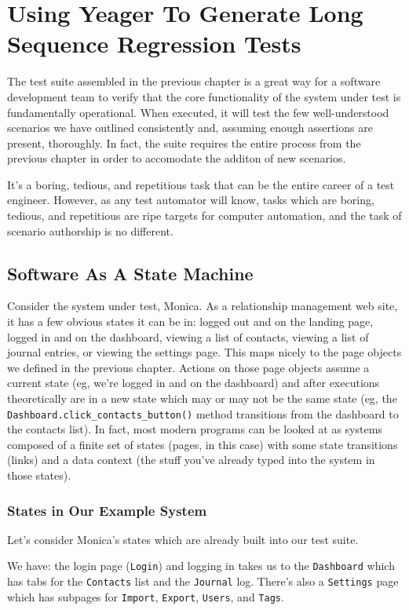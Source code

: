 \chapter{Using Yeager To Generate Long Sequence Regression Tests}
The test suite assembled in the previous chapter is a great way for a software development team to verify that the core functionality of the system under test is fundamentally operational. When executed, it will test the few well-understood scenarios we have outlined consistently and, assuming enough assertions are present, thoroughly. In fact, the suite requires the entire process from the previous chapter in order to accomodate the additon of new scenarios.

It's a boring, tedious, and repetitious task that can be the entire career of a test engineer. However, as any test automator will know, tasks which are boring, tedious, and repetitious are ripe targets for computer automation, and the task of scenario authorship is no different.

\section{Software As A State Machine}
Consider the system under test, Monica. As a relationship management web site, it has a few obvious states it can be in: logged out and on the landing page, logged in and on the dashboard, viewing a list of contacts, viewing a list of journal entries, or viewing the settings page. This maps nicely to the page objects we defined in the previous chapter. Actions on those page objects assume a current state (eg, we're logged in and on the dashboard) and after executions theoretically are in a new state which may or may not be the same state (eg, the \texttt{Dashboard.click\_contacts\_button()} method transitions from the dashboard to the contacts list). In fact, most modern programs can be looked at as systems composed of a finite set of states (pages, in this case) with some state transitions (links) and a data context (the stuff you've already typed into the system in those states).

\subsection{States in Our Example System}
Let's consider Monica's states which are already built into our test suite.

We have: the login page (\texttt{Login}) and logging in takes us to the \texttt{Dashboard} which has tabs for the \texttt{Contacts} list and the \texttt{Journal} log. There's also a \texttt{Settings} page which has subpages for \texttt{Import}, \texttt{Export}, \texttt{Users}, and \texttt{Tags}.

